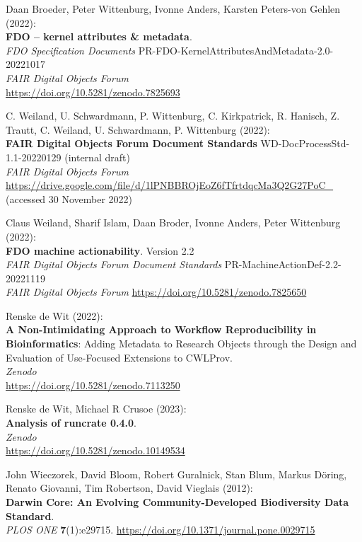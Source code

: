 \begin{thebibliography}{9}
Daan Broeder, Peter Wittenburg, Ivonne Anders, Karsten Peters-von
Gehlen (2022): \\
\textbf{FDO -- kernel attributes \& metadata}.\\ 
\emph{FDO Specification Documents} PR-FDO-KernelAttributesAndMetadata-2.0-20221017 \\
\emph{FAIR Digital Objects Forum}\\
\url{https://doi.org/10.5281/zenodo.7825693}

C. Weiland, U. Schwardmann, P. Wittenburg, C. Kirkpatrick, R. Hanisch,
Z. Trautt, C. Weiland, U. Schwardmann, P. Wittenburg (2022):\\
\textbf{{FAIR Digital Objects Forum Document Standards}} WD-DocProcessStd-1.1-20220129 (internal draft) \\
\emph{FAIR Digital Objects Forum}\\
\url{https://drive.google.com/file/d/1lPNBBROjEoZ6fTfrtdqcMa3Q2G27PoC_}
(accessed 30 November 2022)

Claus Weiland, Sharif Islam, Daan Broder, Ivonne Anders, Peter Wittenburg (2022): \\
\textbf{{FDO} machine actionability}. Version 2.2 \\
\emph{{FAIR Digital Objects Forum Document Standards}} PR-MachineActionDef-2.2-20221119 \\
\emph{FAIR Digital Objects Forum}
\url{https://doi.org/10.5281/zenodo.7825650}

Renske de Wit (2022):\\
\textbf{A Non-Intimidating Approach to Workflow Reproducibility in Bioinformatics}: Adding Metadata to Research Objects through the Design and Evaluation of Use-Focused Extensions to CWLProv.\\
\emph{Zenodo}\\
\url{https://doi.org/10.5281/zenodo.7113250}

Renske de Wit, Michael R Crusoe (2023):\\
\textbf{Analysis of runcrate 0.4.0}.\\
\emph{Zenodo}\\
\url{https://doi.org/10.5281/zenodo.10149534}

John Wieczorek, David Bloom, Robert Guralnick, Stan Blum, Markus Döring,
Renato Giovanni, Tim Robertson, David Vieglais (2012): \\
\textbf{Darwin {Core}: {An Evolving Community-Developed Biodiversity Data Standard}}.\\
\emph{PLOS ONE} \textbf{7}(1):e29715.
\url{https://doi.org/10.1371/journal.pone.0029715}


\end{thebibliography}
